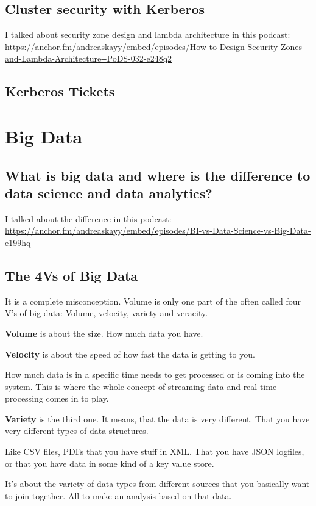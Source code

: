 \documentclass[12pt, numbers=noenddot]{scrreprt} %
\begin{document}
\section{Cluster security with Kerberos}

I talked about security zone design and lambda architecture in this podcast: \url{https://anchor.fm/andreaskayy/embed/episodes/How-to-Design-Security-Zones-and-Lambda-Architecture--PoDS-032-e248q2}

\section{Kerberos Tickets}


\chapter{Big Data}
\section{What is big data and where is the difference to data science and data analytics?}
I talked about the difference in this podcast: \url{https://anchor.fm/andreaskayy/embed/episodes/BI-vs-Data-Science-vs-Big-Data-e199hq}

\section{The 4Vs of Big Data}

It is a complete misconception. Volume is only one part of the often called four V’s of big data: Volume, velocity, variety and veracity.

\textbf{Volume} is about the size. How much data you have.

\textbf{Velocity} is about the speed of how fast the data is getting to you.

How much data is in a specific time needs to get processed or is coming into the system. This is where the whole concept of streaming data and real-time processing comes in to play.

\textbf{Variety} is the third one. It means, that the data is very different. That you have very different types of data structures.

Like CSV files, PDFs that you have stuff in XML. That you have JSON logfiles, or that you have data in some kind of a key value store.

It’s about the variety of data types from different sources that you basically want to join together. All to make an analysis based on that data.
\end{document}
